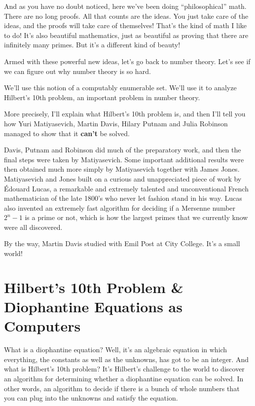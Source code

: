 \documentclass[12pt]{book}
\begin{document}
And as you have no doubt noticed, here we've been doing ``philosophical'' math.
There are no long proofs.
All that counts are the ideas. You just take care of the ideas, and the proofs will take
care of themselves!
That's the kind of math I like to do!
It's also beautiful mathematics, just as beautiful as proving that there are infinitely many primes.
But it's a different kind of beauty!

Armed with these powerful new ideas, let's go back to number theory.
Let's see if we can figure out why number theory is so hard.

We'll use this notion of a computably enumerable set. 
We'll use it to analyze Hilbert's 10th problem, an important problem in number theory.

More precisely, I'll explain what Hilbert's 10th problem is, and then I'll tell you
how Yuri Matiyasevich, Martin Davis, Hilary Putnam and Julia Robinson 
managed to show that it \textbf{can't} be solved. 

Davis, Putnam and Robinson did much of the preparatory work, and then the final steps
were taken by Matiyasevich. Some important additional results were then
obtained much more simply by Matiyasevich together with James Jones. 
Matiyasevich and Jones built on a curious and unappreciated piece of work by \'Edouard Lucas,
a remarkable and extremely talented and unconventional French mathematician of the late 1800's 
who never let fashion stand in his way.
Lucas also invented an extremely fast algorithm for deciding if a Mersenne number
$2^n - 1$ is a prime or not, which is how the largest primes that we currently
know were all discovered. 

By the way, Martin Davis studied with Emil Post at City College. It's a small world!

\section*{Hilbert's 10th Problem \& Diophantine Equations as Computers}

What is a diophantine equation? Well, it's an algebraic equation in which everything, the
constants as well as the unknowns, has got to be an integer.
And what is Hilbert's 10th problem? It's Hilbert's challenge to the world to discover an
algorithm for determining whether a diophantine equation can be solved.  In other words,
an algorithm to decide if there is a bunch of whole numbers that you can plug into 
the unknowns and satisfy the equation.
\end{document}
